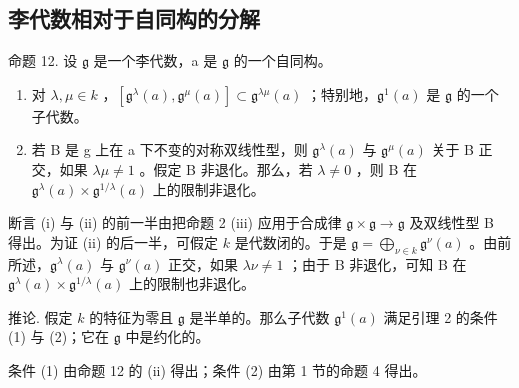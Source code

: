 \subsection{李代数相对于自同构的分解}

命题 12. 设 \(\mathfrak{g}\) 是一个李代数，a 是 \(\mathfrak{g}\) 的一个自同构。

\begin{enumerate}
\def\labelenumi{(\roman{enumi})}
\item
  对 \(\lambda, \mu \in k\) ，\([\mathfrak{g}^{\lambda}(a), \mathfrak{g}^{\mu}(a)] \subset \mathfrak{g}^{\lambda \mu}(a)\) ；特别地，\(\mathfrak{g}^1(a)\) 是 \(\mathfrak{g}\) 的一个子代数。
\item
  若 B 是 g 上在 a 下不变的对称双线性型，则 \(\mathfrak{g}^{\lambda}(a)\) 与 \(\mathfrak{g}^{\mu}(a)\) 关于 B 正交，如果 \(\lambda\mu \neq 1\) 。假定 B 非退化。那么，若 \(\lambda \neq 0\) ，则 B 在 \(\mathfrak{g}^{\lambda}(a) \times \mathfrak{g}^{1/\lambda}(a)\) 上的限制非退化。
\end{enumerate}

断言 (i) 与 (ii) 的前一半由把命题 2 (iii) 应用于合成律 \(\mathfrak{g} \times \mathfrak{g} \to \mathfrak{g}\) 及双线性型 B 得出。为证 (ii) 的后一半，可假定 \(k\) 是代数闭的。于是 \(\mathfrak{g} = \bigoplus_{\nu \in k} \mathfrak{g}^{\nu}(a)\) 。由前所述，\(\mathfrak{g}^{\lambda}(a)\) 与 \(\mathfrak{g}^{\nu}(a)\) 正交，如果 \(\lambda \nu \neq 1\) ；由于 B 非退化，可知 B 在 \(\mathfrak{g}^{\lambda}(a) \times \mathfrak{g}^{1/\lambda}(a)\) 上的限制也非退化。

推论. 假定 \(k\) 的特征为零且 \(\mathfrak{g}\) 是半单的。那么子代数 \(\mathfrak{g}^1(a)\) 满足引理 2 的条件 (1) 与 (2)；它在 \(\mathfrak{g}\) 中是约化的。

条件 (1) 由命题 12 的 (ii) 得出；条件 (2) 由第 1 节的命题 4 得出。

